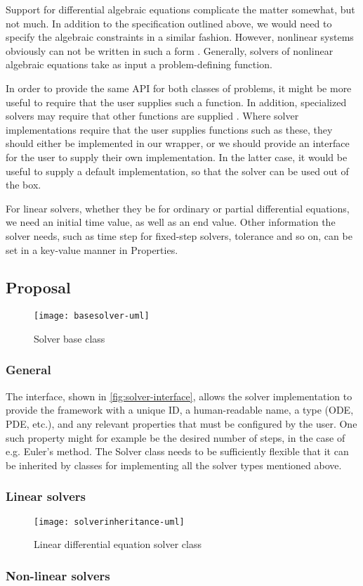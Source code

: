 \documentclass[\rootfolder/main.tex]{subfiles}
\begin{document}
Support for differential algebraic equations complicate the matter somewhat, but not much.
In addition to the specification outlined above, we would need to specify the algebraic constraints in a similar fashion.
However, nonlinear systems obviously can not be written in such a form \cite{khalil}.
Generally, solvers of nonlinear algebraic equations take as input a problem-defining function.

In order to provide the same API for both classes of problems, it might be more useful to require that the user supplies such a function.
In addition, specialized solvers may require that other functions are supplied \cite{kinsol}\cite{cvode}\cite{ida}.
Where solver implementations require that the user supplies functions such as these, they should either be implemented in our wrapper,
or we should provide an interface for the user to supply their own implementation.
In the latter case, it would be useful to supply a default implementation, so that the solver can be used out of the box.

For linear solvers, whether they be for ordinary or partial differential equations, we need an initial time value, as well as an end value.
Other information the solver needs, such as time step for fixed-step solvers, tolerance and so on, can be set in a key-value manner in Properties.

\subsection{Proposal}

\begin{figure}[h]
  \centering
  \texttt{[image: basesolver-uml]}
  \caption{Solver base class}
  \label{fig:solver-baseclass}
\end{figure}

\subsubsection{General}

The interface, shown in \cref{fig:solver-interface}, allows the solver implementation to provide the framework with a unique ID, a human-readable name, a
type (ODE, PDE, etc.\@), and any relevant properties that must be configured by the user.
One such property might for example be the desired number of steps, in the case of e.g. Euler's method.
The Solver class needs to be sufficiently flexible that it can be inherited by classes for implementing all the solver types mentioned above.

\subsubsection{Linear solvers}

\begin{figure}[h]
  \centering
  \texttt{[image: solverinheritance-uml]}
  \caption{Linear differential equation solver class}
  \label{fig:solver-linear}
\end{figure}


\subsubsection{Non-linear solvers}
\end{document}
